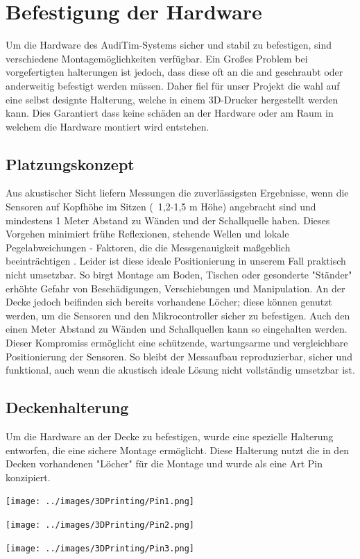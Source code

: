 \chapter{Befestigung der Hardware}
\label{chap:Befestigung_der_Hardware}
Um die Hardware des AudiTim-Systems sicher und stabil zu befestigen, sind verschiedene Montagemöglichkeiten verfügbar. 
Ein Großes Problem bei vorgefertigten halterungen ist jedoch, dass diese oft an die and geschraubt oder anderweitig befestigt werden müssen.
Daher fiel für unser Projekt die wahl auf eine selbst designte Halterung, welche in einem 3D-Drucker hergestellt werden kann.
Dies Garantiert dass keine schäden an der Hardware oder am Raum in welchem die Hardware montiert wird entstehen.

\section{Platzungskonzept}
Aus akustischer Sicht liefern Messungen die zuverlässigsten Ergebnisse, wenn die Sensoren auf Kopfhöhe im Sitzen (~1,2-1,5 m Höhe) angebracht sind und mindestens 1 Meter Abstand zu Wänden und der Schallquelle haben. 
Dieses Vorgehen minimiert frühe Reflexionen, stehende Wellen und lokale Pegelabweichungen - Faktoren, die die Messgenauigkeit maßgeblich beeinträchtigen \cite{oltheten2019micplacement} .
Leider ist diese ideale Positionierung in unserem Fall praktisch nicht umsetzbar. So birgt Montage am Boden, Tischen oder gesonderte "Ständer" erhöhte Gefahr von Beschädigungen, Verschiebungen und Manipulation.
An der Decke jedoch beifinden sich bereits vorhandene Löcher; diese können genutzt werden, um die Sensoren und den Mikrocontroller sicher zu befestigen. 
Auch den einen Meter Abstand zu Wänden und Schallquellen kann so eingehalten werden.
Dieser Kompromiss ermöglicht eine schützende, wartungsarme und vergleichbare Positionierung der Sensoren.
So bleibt der Messaufbau reproduzierbar, sicher und funktional, auch wenn die akustisch ideale Lösung nicht vollständig umsetzbar ist.

\section{Deckenhalterung}
Um die Hardware an der Decke zu befestigen, wurde eine spezielle Halterung entworfen, die eine sichere Montage ermöglicht.
Diese Halterung nutzt die in den Decken vorhandenen "Löcher" für die Montage und wurde als eine Art Pin konzipiert.

\begin{center}
  \begin{minipage}[b]{0.32\textwidth}
    \texttt{[image: ../images/3DPrinting/Pin1.png]}
  \end{minipage}
  \hfill
  \begin{minipage}[b]{0.32\textwidth}
    \texttt{[image: ../images/3DPrinting/Pin2.png]}
  \end{minipage}
  \hfill
  \begin{minipage}[b]{0.32\textwidth}
    \texttt{[image: ../images/3DPrinting/Pin3.png]}
  \end{minipage}
\end{center}

